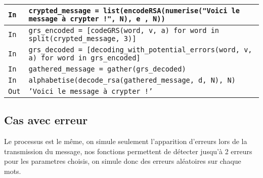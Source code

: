 \documentclass[titlepage]{article}
\begin{document}
        \begin{tabularx}{12cm}{|p{0.60cm}|X|}
            \hline
            \rowcolor{gray}
            \texttt{In}
            & 
            \texttt{crypted\_message = list(encodeRSA(numerise("Voici le message à crypter !", N), e , N))}
            \\
            \hline
            \rowcolor{gray}
            \texttt{In}
            &
            \texttt{grs\_encoded = [codeGRS(word, v, a) for word in split(crypted\_message, 3)]}
            \\
            \hline
            \rowcolor{gray}
            \texttt{In}
            &
            \texttt{grs\_decoded = [decoding\_with\_potential\_errors(word, v, a) for word in grs\_encoded]}
            \\
            \hline
            \rowcolor{gray}
            \texttt{In}
            &
            \texttt{gathered\_message = gather(grs\_decoded)}
            \\
            \hline
            \rowcolor{gray}
            \texttt{In}
            &
            \texttt{alphabetise(decode\_rsa(gathered\_message, d, N), N)}
            \\
            \hline
            \texttt{Out}
            &
            \texttt{'Voici le message à crypter !'}
            \\
            \hline
        \end{tabularx}
        \bigbreak
    
    \subsection{Cas avec erreur}

        Le processus est le même, on simule seulement l'apparition d'erreurs lors de la transmission du message, nos fonctions permettent de détecter jusqu'à 2 erreurs pour les parametres choisis, 
        on simule donc des erreurs aléatoires sur chaque mots.
        \bigbreak
    
\end{document}
